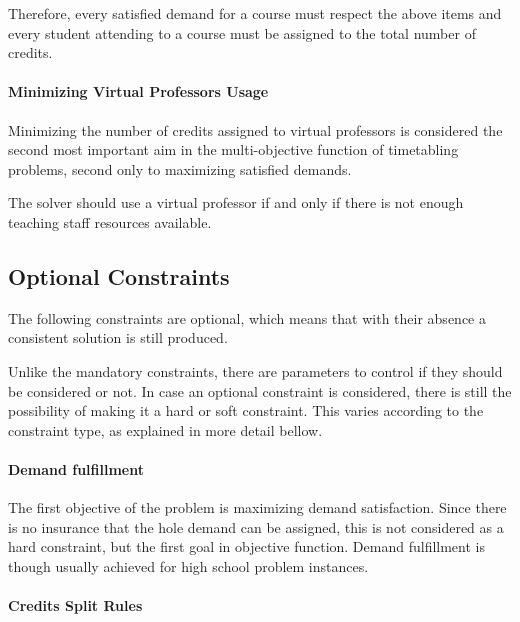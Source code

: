 Therefore, every satisfied demand for a course must respect the above items and every student attending to a course must be assigned to the total number of credits.


\paragraph{Minimizing Virtual Professors Usage}
\label{constrvirtprof}

Minimizing the number of credits assigned to virtual professors is considered the second most important aim in the multi-objective function of timetabling problems, second only to maximizing satisfied demands.

The solver should use a virtual professor if and only if there is not enough teaching staff resources available.


\subsection{Optional Constraints}
\label{subsec:optional}

The following constraints are optional, which means that with their absence a consistent solution is still produced.

Unlike the mandatory constraints, there are parameters to control if they should be considered or not. In case an optional constraint is considered, there is still the possibility of making it a hard or soft constraint. This varies according to the constraint type, as explained in more detail bellow.


\paragraph{Demand fulfillment}
\label{constrdemandfulfillm}

The first objective of the problem is maximizing demand satisfaction. Since there is no insurance that the hole demand can be assigned, this is not considered as a hard constraint, but the first goal in objective function. Demand fulfillment is though usually achieved for high school problem instances.



\paragraph{Credits Split Rules}
\label{constrsplit}

